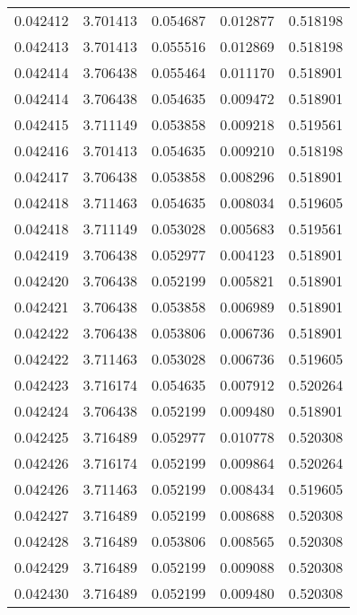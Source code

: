 \begin{tabular}{lrrrr}
0.042412    &  3.701413 &  0.054687 &  0.012877 &             0.518198 \\
0.042413    &  3.701413 &  0.055516 &  0.012869 &             0.518198 \\
0.042414    &  3.706438 &  0.055464 &  0.011170 &             0.518901 \\
0.042414    &  3.706438 &  0.054635 &  0.009472 &             0.518901 \\
0.042415    &  3.711149 &  0.053858 &  0.009218 &             0.519561 \\
0.042416    &  3.701413 &  0.054635 &  0.009210 &             0.518198 \\
0.042417    &  3.706438 &  0.053858 &  0.008296 &             0.518901 \\
0.042418    &  3.711463 &  0.054635 &  0.008034 &             0.519605 \\
0.042418    &  3.711149 &  0.053028 &  0.005683 &             0.519561 \\
0.042419    &  3.706438 &  0.052977 &  0.004123 &             0.518901 \\
0.042420    &  3.706438 &  0.052199 &  0.005821 &             0.518901 \\
0.042421    &  3.706438 &  0.053858 &  0.006989 &             0.518901 \\
0.042422    &  3.706438 &  0.053806 &  0.006736 &             0.518901 \\
0.042422    &  3.711463 &  0.053028 &  0.006736 &             0.519605 \\
0.042423    &  3.716174 &  0.054635 &  0.007912 &             0.520264 \\
0.042424    &  3.706438 &  0.052199 &  0.009480 &             0.518901 \\
0.042425    &  3.716489 &  0.052977 &  0.010778 &             0.520308 \\
0.042426    &  3.716174 &  0.052199 &  0.009864 &             0.520264 \\
0.042426    &  3.711463 &  0.052199 &  0.008434 &             0.519605 \\
0.042427    &  3.716489 &  0.052199 &  0.008688 &             0.520308 \\
0.042428    &  3.716489 &  0.053806 &  0.008565 &             0.520308 \\
0.042429    &  3.716489 &  0.052199 &  0.009088 &             0.520308 \\
0.042430    &  3.716489 &  0.052199 &  0.009480 &             0.520308 \\

\end{tabular}
